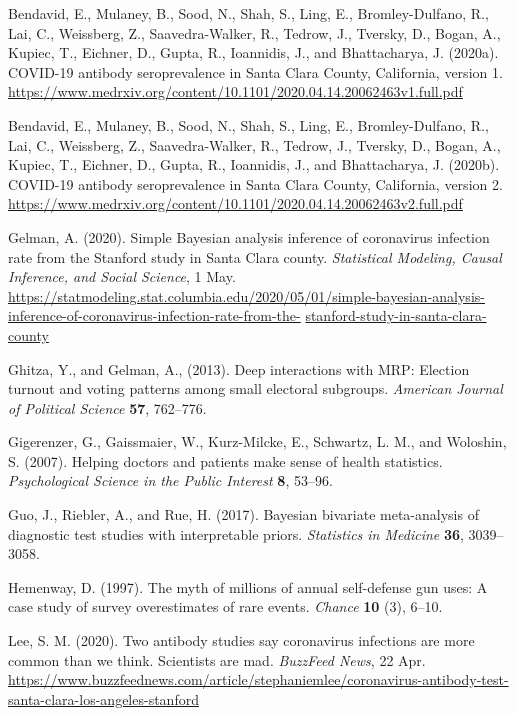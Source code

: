 \documentclass[11pt]{article}
\begin{document}
\noindent

\bibitem  Bendavid, E., Mulaney, B., Sood, N., Shah, S., Ling, E., Bromley-Dulfano, R., Lai, C.,  Weissberg, Z., Saavedra-Walker, R., Tedrow, J., Tversky, D., Bogan, A., Kupiec, T., Eichner, D., Gupta, R., Ioannidis, J., and Bhattacharya, J. (2020a).  COVID-19 antibody seroprevalence in Santa Clara County, California, version 1. \url{https://www.medrxiv.org/content/10.1101/2020.04.14.20062463v1.full.pdf}

\bibitem  Bendavid, E., Mulaney, B., Sood, N., Shah, S., Ling, E., Bromley-Dulfano, R., Lai, C.,  Weissberg, Z., Saavedra-Walker, R., Tedrow, J., Tversky, D., Bogan, A., Kupiec, T., Eichner, D., Gupta, R., Ioannidis, J., and Bhattacharya, J. (2020b).  COVID-19 antibody seroprevalence in Santa Clara County, California, version 2. \url{https://www.medrxiv.org/content/10.1101/2020.04.14.20062463v2.full.pdf}

\bibitem Gelman, A. (2020).  Simple Bayesian analysis inference of coronavirus infection rate from the Stanford study in Santa Clara county. {\em Statistical Modeling, Causal Inference, and Social Science}, 1 May.  \url{https://statmodeling.stat.columbia.edu/2020/05/01/simple-bayesian-analysis-inference-of-coronavirus-infection-rate-from-the-} \url{stanford-study-in-santa-clara-county}

\bibitem Ghitza, Y., and Gelman, A., (2013). Deep interactions with MRP: Election turnout and voting patterns among small electoral subgroups. {\em American Journal of Political Science} {\bf 57}, 762--776. 
  
\bibitem Gigerenzer, G., Gaissmaier, W., Kurz-Milcke, E., Schwartz, L. M., and Woloshin, S.  (2007).  Helping doctors and patients make sense of health statistics.  {\em Psychological Science in the Public Interest} {\bf 8}, 53--96.

\bibitem Guo, J., Riebler, A., and Rue, H. (2017).  Bayesian bivariate meta-analysis of diagnostic test studies with interpretable priors.  {\em Statistics in Medicine} {\bf 36}, 3039--3058.

\bibitem Hemenway, D. (1997).  The myth of millions of annual self-defense gun uses:  A case study of survey overestimates of rare events.  {\em Chance} {\bf 10} (3), 6--10.

\bibitem Lee, S. M. (2020).  Two antibody studies say coronavirus infections are more common than we think. Scientists are mad.  {\em BuzzFeed News}, 22 Apr.  \url{https://www.buzzfeednews.com/article/stephaniemlee/coronavirus-antibody-test-santa-clara-los-angeles-stanford}
\end{document}
